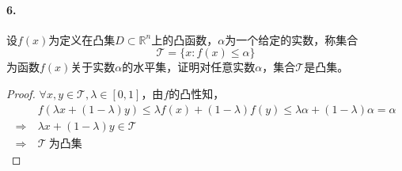 \documentclass[12pt, a4paper, oneside]{ctexart}
\begin{document}
\paragraph{6.}设$f(x)$为定义在凸集$D\subset \mathbb{R}^n$上的凸函数，$\alpha$为一个给定的实数，称集合
\begin{equation*}
    \mathcal{T} =\{x:f(x)\leqslant \alpha\}
\end{equation*}
为函数$f(x)$关于实数$\alpha$的水平集，证明对任意实数$\alpha$，集合$\mathcal{T}$是凸集。
\begin{proof}
    $\forall x, y\in \mathcal{T},\lambda\in [0,1]$，由$f$的凸性知，
    \begin{equation*}
        \begin{aligned}
            &\ f(\lambda x+(1-\lambda)y)\leqslant \lambda f(x)+(1-\lambda)f(y)\leqslant \lambda \alpha + (1-\lambda)\alpha= \alpha\\
            \Rightarrow&\ \lambda x+(1-\lambda)y\in \mathcal{T}\\
            \Rightarrow&\ \mathcal{T}\ \text{为凸集}
        \end{aligned}
    \end{equation*}
\end{proof}
\end{document}
